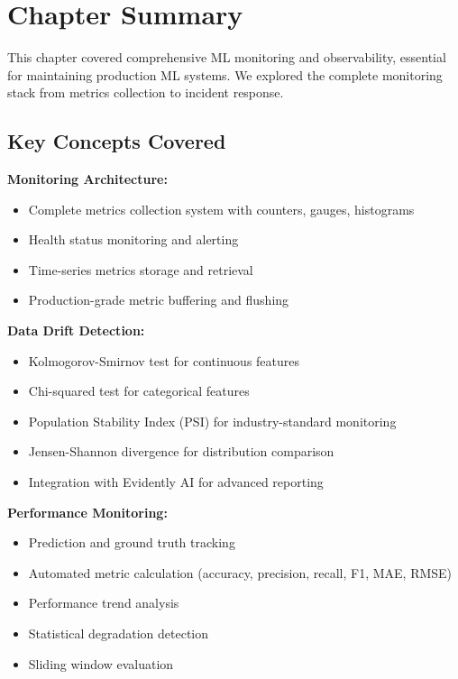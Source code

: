 \section{Chapter Summary}

This chapter covered comprehensive ML monitoring and observability, essential for maintaining production ML systems. We explored the complete monitoring stack from metrics collection to incident response.

\subsection{Key Concepts Covered}

\textbf{Monitoring Architecture:}
\begin{itemize}
    \item Complete metrics collection system with counters, gauges, histograms
    \item Health status monitoring and alerting
    \item Time-series metrics storage and retrieval
    \item Production-grade metric buffering and flushing
\end{itemize}

\textbf{Data Drift Detection:}
\begin{itemize}
    \item Kolmogorov-Smirnov test for continuous features
    \item Chi-squared test for categorical features
    \item Population Stability Index (PSI) for industry-standard monitoring
    \item Jensen-Shannon divergence for distribution comparison
    \item Integration with Evidently AI for advanced reporting
\end{itemize}

\textbf{Performance Monitoring:}
\begin{itemize}
    \item Prediction and ground truth tracking
    \item Automated metric calculation (accuracy, precision, recall, F1, MAE, RMSE)
    \item Performance trend analysis
    \item Statistical degradation detection
    \item Sliding window evaluation
\end{itemize}

